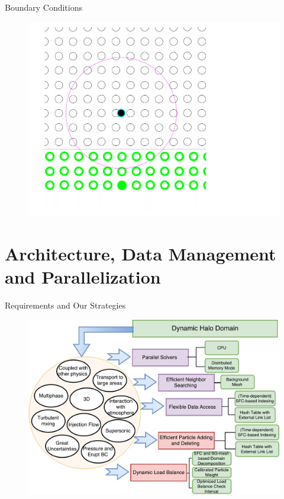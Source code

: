\documentclass{beamer}
\begin{document}
\begin{frame}{Boundary Conditions}
\begin{minipage}{0.325\textwidth}
\begin{figure}
\includegraphics[width=0.99 \textwidth]{./PPT/BC_wall1}
\end{figure}
\end{minipage}
\end{frame}

\section{Architecture, Data Management and Parallelization}
\begin{frame}{Requirements and Our Strategies}
\begin{figure}[!t]
\centering
\includegraphics[scale=0.35]{./PPT/Requirement_all}
\label{fig:Requirements}
\end{figure}
\end{frame}
\end{document}
